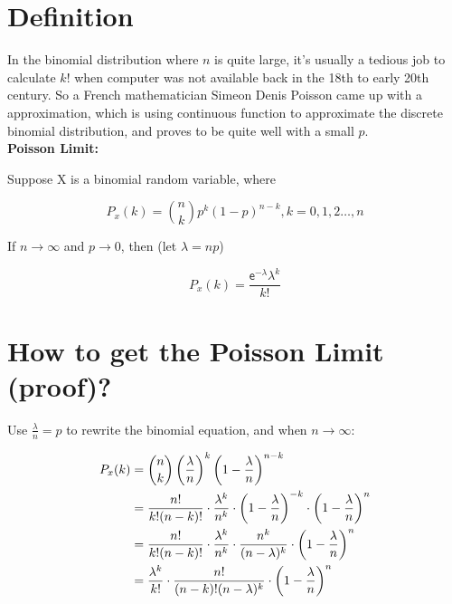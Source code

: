 \documentclass[12pt]{article}
\begin{document}



\setcounter{figure}{0}

\vspace{10pt}


\section{\large Definition}

In the binomial distribution where $n$ is quite large,  it's usually a tedious job to calculate $k!$ when computer was not available back in the 18th to early 20th century.  So a French mathematician Simeon Denis Poisson came up with a approximation,  which is using continuous function to approximate the discrete binomial distribution,  and proves to be quite well with a small $p$.\\

\textbf {Poisson Limit:}

Suppose X is a binomial random variable,  where

$$
P_x (k) = \displaystyle\binom {n}{k} p^k (1-p)^{n-k},  k=0, 1,2 \dots, n
$$

If $n \rightarrow \infty$ and $p \rightarrow 0$,  then (let $\lambda = np$)

$$
P_x (k) = \frac {\mathsf{e}^{-\lambda} \lambda^k } {k!}
$$

\section{\large How to get the Poisson Limit (proof)?}

Use $ {\displaystyle \frac{\lambda}{n} = p }$ to rewrite the binomial equation,  and when $n \rightarrow \infty$: 

$$
\begin{aligned}[t]
P_x(k)  
    &= \binom {n}{k} \left( \frac{\lambda}{n} \right) ^k \left( 1-\frac{\lambda}{n} \right) ^{n-k}   \\
    &=  \frac{n!}{k!(n-k)!} \cdot \frac{\lambda ^ k}{n^k} \cdot \left( 1-\frac{\lambda}{n} \right) ^{-k} \cdot \left( 1-\frac{\lambda}{n} \right) ^n   \\
    &= \frac{n!}{k!(n-k)!} \cdot \frac{\lambda ^ k}{n^k} \cdot  \frac{n^k}{(n - \lambda)^k}  \cdot \left( 1-\frac{\lambda}{n} \right) ^n   \\
    &= \frac{\lambda ^k}{k!} \cdot \frac{n!}{(n-k)!(n- \lambda)^k} \cdot  \left( 1-\frac{\lambda}{n} \right) ^n   \\
     \end{aligned}\\
$$
\end{document}
